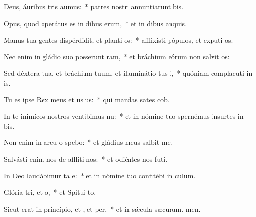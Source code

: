 \item Deus, áuribus tris aumus:~* patres nostri annuntiarunt bis.
\item Opus, quod operátus es in dibus erum,~* et in dibus anquis.
\item Manus tua gentes dispérdidit, et planti os:~* afflixísti pópulos, et exputi os.
\item Nec enim in gládio suo posserunt ram,~* et bráchium eórum non salvit os:
\item Sed déxtera tua, et bráchium tuum, et illuminátio tus i,~* quóniam complacuti in is.
\item Tu es ipse Rex meus et us us:~* qui mandas sates cob.
\item In te inimícos nostros ventibimus nu:~* et in nómine tuo spernémus insurtes in bis.
\item Non enim in arcu o spebo:~* et gládius meus  salbit me.
\item Salvásti enim nos de affliti nos:~* et odiéntes nos futi.
\item In Deo laudábimur ta e:~* et in nómine tuo confitébi in culum.
\item Glória tri, et o,~* et Spitui to.
\item Sicut erat in princípio, et , et per,~* et in sǽcula sæcurum. men.
